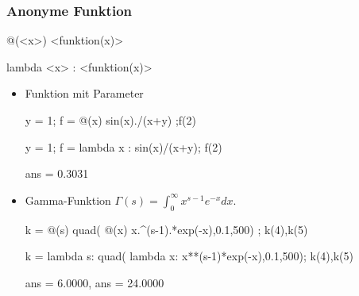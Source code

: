 \documentclass[hyperref={xetex}]{beamer}
\begin{document}
%
%
\begin{frame}[fragile]\frametitle{Anonyme Funktion}
\begin{matlabin}
@(<x>) <funktion(x)>
\end{matlabin}
\begin{pyin}
lambda <x> : <funktion(x)>  
\end{pyin}

\begin{itemize}
\item Funktion mit Parameter
\begin{matlabin}
y = 1; f = @(x) sin(x)./(x+y) ;f(2)
\end{matlabin}
\begin{pyin}
y = 1; f = lambda x : sin(x)/(x+y); f(2)
\end{pyin}
\begin{matlab}
ans =  0.3031
\end{matlab}

\item Gamma-Funktion $\Gamma(s) = \int_0^\infty x^{s-1} e^{-x} dx$.
\begin{matlabin}
k = @(s) quad( @(x) x.^(s-1).*exp(-x),0.1,500) ; k(4),k(5)
\end{matlabin}
\begin{pyin}
k = lambda s: quad( lambda x: x**(s-1)*exp(-x),0.1,500); k(4),k(5)  
\end{pyin}
\begin{matlab}
ans = 6.0000, ans = 24.0000
\end{matlab}

\end{itemize}
\end{frame}
\end{document}
